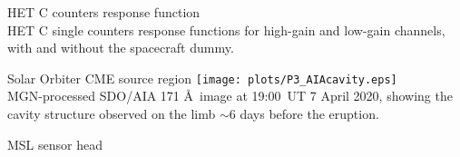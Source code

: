 \documentclass[10pt,aspectratio=169,usenames,dvipsnames]{beamer}
\begin{document}
\begin{frame}{HET C counters response function}
\centering
\scalebox{0.75}{}\\
HET C single counters response functions for high-gain and low-gain channels, with and without the spacecraft dummy.
\end{frame}

\begin{frame}{Solar Orbiter CME source region}
    \centering
    \texttt{[image: plots/P3\_AIAcavity.eps]}\\   
    MGN-processed SDO/AIA 171 \AA\ image at 19:00~UT 7 April 2020, showing the cavity structure observed on the limb  $\sim$6 days before the eruption.
\end{frame}

\begin{frame}{MSL sensor head}
    \centering
    
\end{frame}
\end{document}
